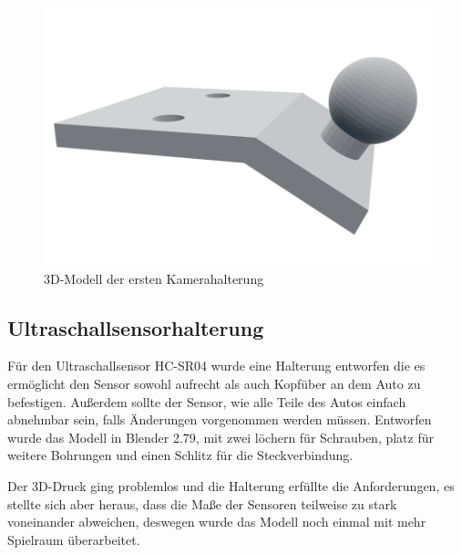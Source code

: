 \documentclass[a4paper, 12pt]{scrartcl}
\begin{document}
\begin{figure}[ht!] \centering
\includegraphics[width=.5\textwidth]{../3D-Druck_Modelle/Kamerahalterung_alt.png}
\caption{3D-Modell der ersten Kamerahalterung}
\label{kamerahalterung alt}
\end{figure}

\subsection{Ultraschallsensorhalterung}

Für den Ultraschallsensor HC-SR04 wurde eine Halterung entworfen die es ermöglicht den Sensor sowohl aufrecht als auch Kopfüber an dem Auto zu befestigen. Außerdem sollte der Sensor, wie alle Teile des Autos einfach abnehmbar sein, falls Änderungen vorgenommen werden müssen. Entworfen wurde das Modell in Blender 2.79, mit zwei löchern für Schrauben, platz für weitere Bohrungen und einen Schlitz für die Steckverbindung.

Der 3D-Druck ging problemlos und die Halterung erfüllte die Anforderungen, es stellte sich aber heraus, dass die Maße der Sensoren teilweise zu stark voneinander abweichen, deswegen wurde das Modell noch einmal mit mehr Spielraum überarbeitet.
\end{document}
